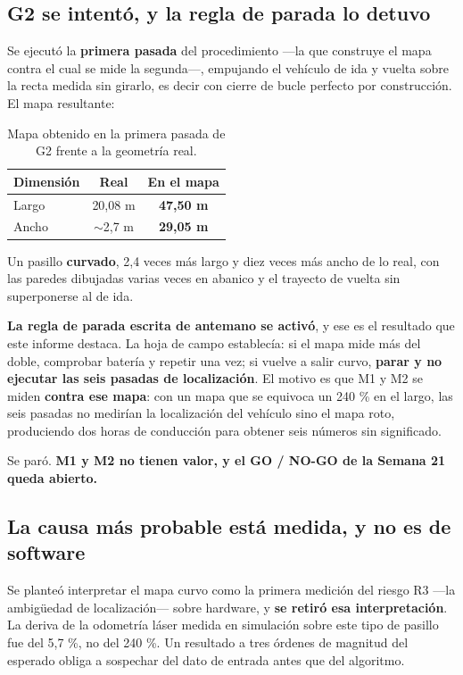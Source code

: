 \documentclass[12pt,letterpaper]{article}
\begin{document}
\subsection{G2 se intentó, y la regla de parada lo detuvo}

Se ejecutó la \textbf{primera pasada} del procedimiento ---la que construye el mapa contra el cual se mide la segunda---, empujando el vehículo de ida y vuelta sobre la recta medida sin girarlo, es decir con cierre de bucle perfecto por construcción. El mapa resultante:

\begin{table}[H]
    \centering
    \small
    \caption{Mapa obtenido en la primera pasada de G2 frente a la geometría real.}
    \label{tab:platano}
    \begin{tabular}{@{}lcc@{}}
        \toprule
        \textbf{Dimensión} & \textbf{Real} & \textbf{En el mapa} \\ \midrule
        Largo & 20,08 m & \textbf{47,50 m} \\
        Ancho & $\sim$2,7 m & \textbf{29,05 m} \\ \bottomrule
    \end{tabular}
\end{table}

Un pasillo \textbf{curvado}, 2,4 veces más largo y diez veces más ancho de lo real, con las paredes dibujadas varias veces en abanico y el trayecto de vuelta sin superponerse al de ida.

\textbf{La regla de parada escrita de antemano se activó}, y ese es el resultado que este informe destaca. La hoja de campo establecía: si el mapa mide más del doble, comprobar batería y repetir una vez; si vuelve a salir curvo, \textbf{parar y no ejecutar las seis pasadas de localización}. El motivo es que M1 y M2 se miden \textbf{contra ese mapa}: con un mapa que se equivoca un 240 \% en el largo, las seis pasadas no medirían la localización del vehículo sino el mapa roto, produciendo dos horas de conducción para obtener seis números sin significado.

Se paró. \textbf{M1 y M2 no tienen valor, y el GO / NO-GO de la Semana 21 queda abierto.}

\subsection{La causa más probable está medida, y no es de software}

Se planteó interpretar el mapa curvo como la primera medición del riesgo R3 ---la ambigüedad de localización--- sobre hardware, y \textbf{se retiró esa interpretación}. La deriva de la odometría láser medida en simulación sobre este tipo de pasillo fue del 5,7 \%, no del 240 \%. Un resultado a tres órdenes de magnitud del esperado obliga a sospechar del dato de entrada antes que del algoritmo.
\end{document}
